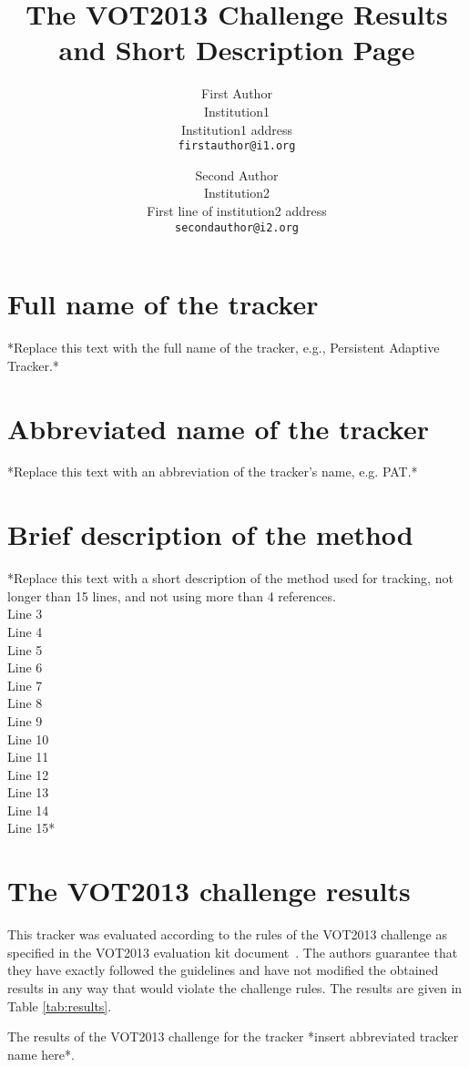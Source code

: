 \documentclass[10pt,twoside]{article}
\date{}
\begin{document}
\title{The VOT2013 Challenge Results and Short Description Page}

\author{First Author\\
Institution1\\
Institution1 address\\
{\tt\small firstauthor@i1.org}
\and
Second Author\\
Institution2\\
First line of institution2 address\\
{\tt\small secondauthor@i2.org}
}

\maketitle

\section{Full name of the tracker} 
*Replace this text with the full name of the tracker, e.g., Persistent Adaptive Tracker.*

\section{Abbreviated name of the tracker}
*Replace this text with an abbreviation of the tracker's name, e.g. PAT.*

\section{Brief description of the method}
*Replace this text with a short description of the method used for tracking, not longer than 15 lines,
and not using more than 4 references.\\
Line 3 \\
Line 4 \\
Line 5 \\
Line 6 \\
Line 7 \\
Line 8 \\
Line 9 \\
Line 10\\
Line 11\\
Line 12\\
Line 13\\
Line 14\\
Line 15*\\

\section{The VOT2013 challenge results}
This tracker was evaluated according to the rules of the VOT2013 challenge
as specified in the VOT2013 evaluation kit document~\cite{VOT2013}.
The authors guarantee that they have exactly followed the guidelines
and have not modified the obtained results in any way that would violate the challenge rules.
The results are given in Table \ref{tab:results}.

\begin{table}
  \caption{The results of the VOT2013 challenge for the tracker *insert abbreviated tracker name here*.}
  \label{tab:results}

\end{table}
{\small
  
  
}
\end{document}
